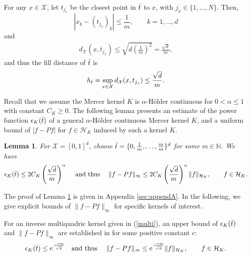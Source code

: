 \documentclass{article}
\def\NN{\mathbb N}
\numberwithin{equation}{section}
\newtheorem{lemma}[theorem]{Lemma}
\begin{document}
For any $x\in \mathcal{X}$, let $t_{j_x}$ be the closest point in $\Bar{t}$ to $x$, with $j_x \in \{1,\ldots, N\}$. Then, \begin{equation*}
    |x_k - (t_{j_x})_k| \leq \frac{1}{m}, \qquad k=1,\ldots, d
\end{equation*}
and 
\begin{eqnarray*}
    d_\mathcal{X}(x, t_{j_x}) \leq \sqrt{d\left(\frac{1}{m}\right)^2} = \frac{\sqrt{d}}{m},
\end{eqnarray*}
and thus the fill distance of $\Bar{t}$ is \begin{equation}\label{fill_tbar}
    h_{\Bar{t}} = \sup_{x\in \mathcal{X}} d_\mathcal{X}(x,t_{j_x})\leq  \frac{\sqrt{d}}{m}.
\end{equation}

Recall that we assume the Mercer kernel $K$ is $\alpha$-H\"{o}lder continuous for $0 < \alpha \leq 1$ with constant $C_K \geq 0$. The following lemma presents an estimate of the power function $\epsilon_K(\Bar{t})$ of a general $\alpha$-H\"{o}lder continuous Mercer kernel $K$, and a uniform bound of $|f-Pf|$ for $f\in \mathcal{H}_K$ induced by such a kernel $K$.
\begin{lemma}\label{lemma:power}
For $\mathcal{X} = [0,1]^d$, choose $\Bar{t}=\{0, \frac{1}{m},\ldots, \frac{m}{m}\}^d$ for some $m\in \NN$. We have
\begin{equation}
\epsilon_K(\Bar{t}) \leq 2C_K \left(\frac{\sqrt{d}}{m}\right)^\alpha \quad
\text { and thus } \quad
  \|f-Pf\|_\infty \leq 2C_K \left(\frac{\sqrt{d}}{m}\right)^\alpha\|f\|_{\mathcal{H}_K}, \qquad f\in  \mathcal{H}_K.
\end{equation}   
\end{lemma}

The proof of Lemma \ref{lemma:power} is given in Appendix \ref{sec:appendA}. In the following, we give explicit bounds of $\|f-Pf\|_\infty$ for specific kernels of interest.

For an inverse multiquadric kernel given in (\ref{multi}), an upper bound of $\epsilon_K(\Bar{t})$ and $\|f-Pf\|_\infty$ are established in  \citep[Equation (15)]{fasshauer2005meshfree} for some positive constant $c$: 
\begin{equation}\label{f-Pf_multi}
\epsilon_K(\Bar{t}) \leq e^{\frac{-cm}{\sqrt{d}}} \quad \text{and thus }\quad  
    \|f-Pf\|_\infty \leq e^{\frac{-cm}{\sqrt{d}}}\|f\|_{\mathcal{H}_K}, \qquad f\in  \mathcal{H}_K.
\end{equation}
\end{document}
